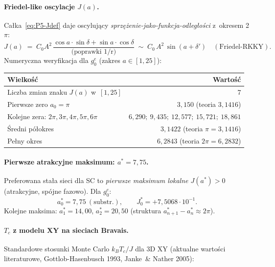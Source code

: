 \paragraph{Friedel-like oscylacje $J(a)$.}
Ca\l{}ka~\eqref{eq:P5-Jdef} daje oscyluj\k{a}cy \emph{sprz\k{e}\.zenie-jako-funkcja-odleg\l{}o\'sci}
z~okresem 2$\pi$:
\begin{equation}
\label{eq:P5-Jpattern}
  J(a) \;=\; C_0 A^2\,\frac{\cos a \cdot \sin\delta + \sin a\cdot \cos\delta}{\text{(poprawki 1/r)}}
  \;\sim\; C_0\,A^2\,\sin(a+\delta')\quad (\text{Friedel-RKKY}).
\end{equation}
Numeryczna weryfikacja dla $g_0^e$ (zakres $a\in[1,25]$):

\begin{center}\footnotesize
\begin{tabular}{@{}lr@{}}
\toprule
Wielko\'s\'c & Warto\'s\'c \\
\midrule
Liczba zmian znaku $J(a)$ w~$[1,25]$ & 7 \\
Pierwsze zero $a_0 = \pi$ & $3{,}150$ (teoria $3{,}1416$) \\
Kolejne zera: $2\pi, 3\pi, 4\pi, 5\pi, 6\pi$ & $6{,}290;\ 9{,}435;\ 12{,}577;\ 15{,}721;\ 18{,}861$ \\
\'Sredni p\'o\l{}okres & $3{,}1422$ (teoria $\pi = 3{,}1416$) \\
Pe\l{}ny okres & $6{,}2843$ (teoria $2\pi = 6{,}2832$) \\
\bottomrule
\end{tabular}
\end{center}

\paragraph{Pierwsze atrakcyjne maksimum: $a^* = 7{,}75$.}
Preferowana sta\l{}a sieci dla SC to \emph{pierwsze maksimum lokalne
$J(a^*) > 0$} (atrakcyjne, sp\'ojne fazowo). Dla $g_0^e$:
\[
  a^*_0 = 7{,}75\ (\text{substr.}),
  \qquad J^*_0 = +7{,}5068\cdot 10^{-1}.
\]
Kolejne maksima: $a^*_1 = 14{,}00$, $a^*_2 = 20{,}50$ (struktura $a^*_{n+1}-a^*_n \approx 2\pi$).

\paragraph{$T_c$ z modelu XY na sieciach Bravais.}
Standardowe stosunki Monte Carlo $k_B T_c / J$ dla 3D XY
(aktualne warto\'sci literaturowe, Gottlob-Hasenbusch 1993, Janke~\& Nather 2005):

